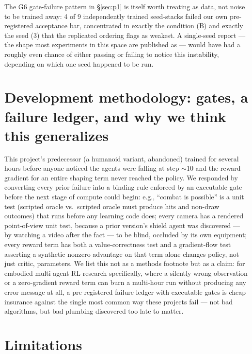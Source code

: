 \documentclass[11pt]{article}
\begin{document}
The G6 gate-failure pattern in \S\ref{sec:p1} is itself worth treating
as data, not noise to be trained away: 4 of 9 independently trained
seed-stacks failed our own pre-registered acceptance bar, concentrated
in exactly the condition (B) and exactly the seed (3) that the
replicated ordering flags as weakest. A single-seed report --- the
shape most experiments in this space are published as --- would have
had a roughly even chance of either passing or failing to notice this
instability, depending on which one seed happened to be run.

\section{Development methodology: gates, a failure ledger, and why we
think this generalizes}
\label{sec:methodology}

This project's predecessor (a humanoid variant, abandoned) trained for
several hours before anyone noticed the agents were falling at step
$\sim$10 and the reward gradient for an entire shaping term never
reached the policy. We responded by converting every prior failure into
a binding rule enforced by an executable gate before the next stage of
compute could begin: e.g., ``combat is possible'' is a unit test
(scripted oracle vs.\ scripted oracle must produce hits and non-draw
outcomes) that runs before any learning code does; every camera has a
rendered point-of-view unit test, because a prior version's shield
agent was discovered --- by watching a video after the fact --- to be
blind, occluded by its own equipment; every reward term has both a
value-correctness test and a gradient-flow test asserting a synthetic
nonzero advantage on that term alone changes policy, not just critic,
parameters. We list this not as a methods footnote but as a claim: for
embodied multi-agent RL research specifically, where a silently-wrong
observation or a zero-gradient reward term can burn a multi-hour run
without producing any error message at all, a pre-registered failure
ledger with executable gates is cheap insurance against the single most
common way these projects fail --- not bad algorithms, but bad plumbing
discovered too late to matter.

\section{Limitations}
\label{sec:limitations}
\end{document}
